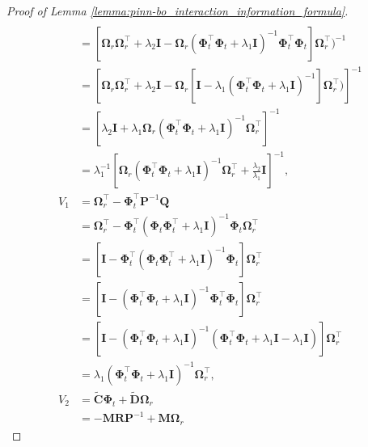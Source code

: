 \begin{proof}[Proof of Lemma \ref{lemma:pinn-bo_interaction_information_formula}]
\begin{align*}
\\
            &= \left[\boldsymbol{\Omega}_r \boldsymbol{\Omega}_r^\top  + \lambda_2\mathbf{I} - \boldsymbol{\Omega}_r (\boldsymbol{\Phi}_t^\top \boldsymbol{\Phi}_t+ \lambda_1\mathbf{I})^{-1} \boldsymbol{\Phi}_t^\top \boldsymbol{\Phi}_t \right] \boldsymbol{\Omega}_r^\top)^{-1} 
\\ 
            &= \left[\boldsymbol{\Omega}_r \boldsymbol{\Omega}_r^\top  + \lambda_2\mathbf{I} - \boldsymbol{\Omega}_r \left[ \mathbf{I} - \lambda_1(\boldsymbol{\Phi}_t^\top \boldsymbol{\Phi}_t+ \lambda_1\mathbf{I})^{-1} \right] \boldsymbol{\Omega}_r^\top)\right]^{-1} 
\\ 
            &= \left[\lambda_2\mathbf{I} + \lambda_1\boldsymbol{\Omega}_r(\boldsymbol{\Phi}_t^\top \boldsymbol{\Phi}_t+ \lambda_1\mathbf{I})^{-1}\boldsymbol{\Omega}_r^\top\right]^{-1} 
\\
            &= \lambda_1^{-1} \left[\boldsymbol{\Omega}_r(\boldsymbol{\Phi}_t^\top \boldsymbol{\Phi}_t+ \lambda_1\mathbf{I})^{-1}\boldsymbol{\Omega}_r^\top + \frac{\lambda_2} {\lambda_1} \mathbf{I}\right]^{-1}, 
\\
            V_1 & = \boldsymbol{\Omega}_r^\top - \boldsymbol{\Phi}_t^\top \mathbf{P}^{-1} \mathbf{Q}
\\
            & = \boldsymbol{\Omega}_r^\top - \boldsymbol{\Phi}_t^\top (\boldsymbol{\Phi}_t\boldsymbol{\Phi}_t^\top + \lambda_1\mathbf{I})^{-1} \boldsymbol{\Phi}_t \boldsymbol{\Omega}_r^\top 
\\
            &=\left[ \mathbf{I} - \boldsymbol{\Phi}_t^\top (\boldsymbol{\Phi}_t\boldsymbol{\Phi}_t^\top + \lambda_1\mathbf{I})^{-1} \boldsymbol{\Phi}_t\right] \boldsymbol{\Omega}_r^\top 
\\
            & = \left[ \mathbf{I} - (\boldsymbol{\Phi}_t^\top\boldsymbol{\Phi}_t + \lambda_1\mathbf{I})^{-1} \boldsymbol{\Phi}_t^\top\boldsymbol{\Phi}_t\right] \boldsymbol{\Omega}_r^\top 
\\
            & = \left[ \mathbf{I} - (\boldsymbol{\Phi}_t^\top\boldsymbol{\Phi}_t + \lambda_1\mathbf{I})^{-1} (\boldsymbol{\Phi}_t^\top\boldsymbol{\Phi}_t +\lambda_1 \mathbf{I} - \lambda_1 \mathbf{I})\right] \boldsymbol{\Omega}_r^\top 
\\
            & = \lambda_1(\boldsymbol{\Phi}_t^\top\boldsymbol{\Phi}_t + \lambda_1\mathbf{I})^{-1} \boldsymbol{\Omega}_r^\top, 
\\
            V_2 & = \widetilde{\mathbf{C}}\boldsymbol{\Phi}_t  + \widetilde{\mathbf{D}}\boldsymbol{\Omega}_r 
\\
            & = -\mathbf{M}\mathbf{R}\mathbf{P}^{-1} + \mathbf{M}\boldsymbol{\Omega}_r 

\end{align*}
\end{proof}
